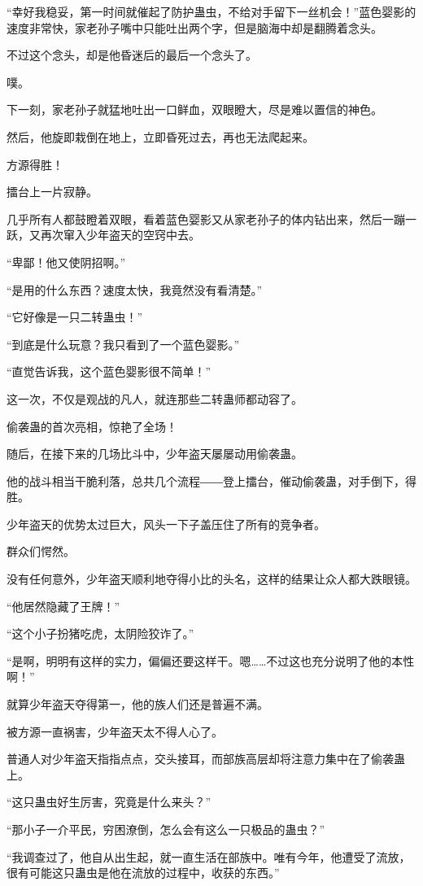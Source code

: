 \begin{this_body}
“幸好我稳妥，第一时间就催起了防护蛊虫，不给对手留下一丝机会！”蓝色婴影的速度非常快，家老孙子嘴中只能吐出两个字，但是脑海中却是翻腾着念头。

不过这个念头，却是他昏迷后的最后一个念头了。

噗。

下一刻，家老孙子就猛地吐出一口鲜血，双眼瞪大，尽是难以置信的神色。

然后，他旋即栽倒在地上，立即昏死过去，再也无法爬起来。

方源得胜！

擂台上一片寂静。

几乎所有人都鼓瞪着双眼，看着蓝色婴影又从家老孙子的体内钻出来，然后一蹦一跃，又再次窜入少年盗天的空窍中去。

“卑鄙！他又使阴招啊。”

“是用的什么东西？速度太快，我竟然没有看清楚。”

“它好像是一只二转蛊虫！”

“到底是什么玩意？我只看到了一个蓝色婴影。”

“直觉告诉我，这个蓝色婴影很不简单！”

这一次，不仅是观战的凡人，就连那些二转蛊师都动容了。

偷袭蛊的首次亮相，惊艳了全场！

随后，在接下来的几场比斗中，少年盗天屡屡动用偷袭蛊。

他的战斗相当干脆利落，总共几个流程――登上擂台，催动偷袭蛊，对手倒下，得胜。

少年盗天的优势太过巨大，风头一下子盖压住了所有的竞争者。

群众们愕然。

没有任何意外，少年盗天顺利地夺得小比的头名，这样的结果让众人都大跌眼镜。

“他居然隐藏了王牌！”

“这个小子扮猪吃虎，太阴险狡诈了。”

“是啊，明明有这样的实力，偏偏还要这样干。嗯……不过这也充分说明了他的本性啊！”

就算少年盗天夺得第一，他的族人们还是普遍不满。

被方源一直祸害，少年盗天太不得人心了。

普通人对少年盗天指指点点，交头接耳，而部族高层却将注意力集中在了偷袭蛊上。

“这只蛊虫好生厉害，究竟是什么来头？”

“那小子一介平民，穷困潦倒，怎么会有这么一只极品的蛊虫？”

“我调查过了，他自从出生起，就一直生活在部族中。唯有今年，他遭受了流放，很有可能这只蛊虫是他在流放的过程中，收获的东西。”


\end{this_body}
